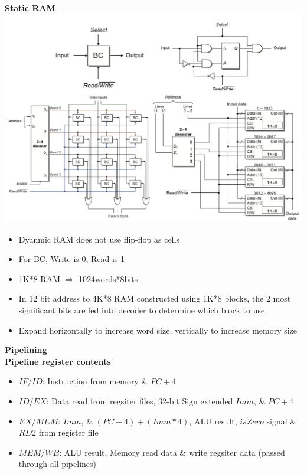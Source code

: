 \documentclass[a4paper]{article} \usepackage[backend=biber, style=numeric, sorting=none]{biblatex}
\begin{document}
\begin{multicols*}{4}
\\ \textbf{{Static RAM}}
\\ {\centering \includegraphics[scale=0.13]{staticRAM}}
\begin{itemize}[leftmargin=*]
\itemsep -0.5em
\item Dyanmic RAM does not use flip-flop as cells
\item For BC, Write is 0, Read is 1 
\item 1K*8 RAM $\Rightarrow$ 1024words*8bits
\item In 12 bit address to 4K*8 RAM constructed using 1K*8 blocks, the 2 most significant bits are fed into decoder to determine which block to use. 
\item Expand horizontally to increase word size, vertically to increase memory size
\end{itemize}


{\small\textbf{Pipelining}}
\\ \textbf{{Pipeline register contents}}
\begin{itemize}[leftmargin=*]
\itemsep -0.5em
\item $IF/ID$: Instruction from memory \& $PC + 4$
\item $ID/EX$: Data read from regsiter files, 32-bit Sign extended $Imm$, \& $PC + 4$
\item $EX/MEM$: $Imm$, \& $(PC + 4) + (Imm * 4)$, ALU result, $isZero$ signal \& $RD2$ from register file
\item $MEM/WB$: ALU result, Memory read data \& write regsiter data (passed through all pipelines)
\end{itemize}


\end{multicols*}
\end{document}
